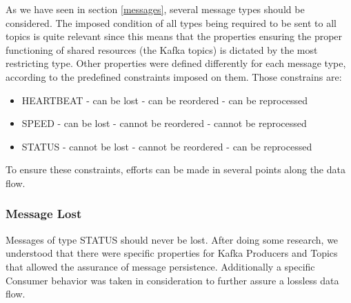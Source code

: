 \documentclass[12pt]{article}
\begin{document}
As we have seen in section \ref{messages}, several message types should be considered.
The imposed condition of all types being required to be sent to all topics is quite relevant since this means that the properties ensuring the proper functioning 
of shared resources (the Kafka topics) is dictated by the most restricting type. 
Other properties were defined differently for each message type, according to the predefined constraints imposed on them.
Those constrains are:
\vspace{-10pt}
\begin{multicols}{3}
  \begin{itemize}
    \item HEARTBEAT
    \newline - can be lost
    \newline - can be reordered
    \newline - can be reprocessed
  \end{itemize}
  \columnbreak
  \begin{itemize}
    \item SPEED
    \newline - can be lost
    \newline - cannot be reordered
    \newline - cannot be reprocessed
  \end{itemize}
  \columnbreak
  \begin{itemize}
    \item STATUS
    \newline - cannot be lost
    \newline - cannot be reordered
    \newline - can be reprocessed
  \end{itemize}
\end{multicols}
\vspace{-10pt}
To ensure these constraints, efforts can be made in several points along the data flow.

\newpage
\subsubsection{Message Lost}\label{lost}

Messages of type STATUS should never be lost.
After doing some research, we understood that there were specific properties for Kafka Producers and Topics that allowed the assurance of message persistence.
Additionally a specific Consumer behavior was taken in consideration to further assure a lossless data flow.
\end{document}
